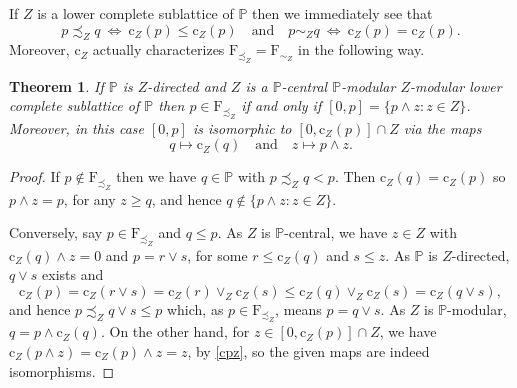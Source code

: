 \documentclass{amsart}
\newtheorem{thm}{Theorem}[section]
\theoremstyle{definition}
\numberwithin{equation}{section}
\begin{document}
If $Z$ is a lower complete sublattice of $\mathbb{P}$ then we immediately see that
\[p\precsim_Zq\ \Leftrightarrow\ \mathrm{c}_Z(p)\leq\mathrm{c}_Z(p)\quad\textrm{and}\quad p\sim_Zq\ \Leftrightarrow\ \mathrm{c}_Z(p)=\mathrm{c}_Z(p).\]
Moreover, $\mathrm{c}_Z$ actually characterizes $\mathrm{F}_{\precsim_Z}=\mathrm{F}_{\sim_Z}$ in the following way.

\begin{thm}
If $\mathbb{P}$ is $Z$-directed and $Z$ is a $\mathbb{P}$-central $\mathbb{P}$-modular $Z$-modular lower complete sublattice of $\mathbb{P}$ then $p\in\mathrm{F}_{\precsim_Z}$ if and only if $[0,p]=\{p\wedge z:z\in Z\}$.  Moreover, in this case $[0,p]$ is isomorphic to $[0,\mathrm{c}_Z(p)]\cap Z$ via the maps \[q\mapsto\mathrm{c}_Z(q)\quad\textrm{and}\quad z\mapsto p\wedge z.\]
\end{thm}

\begin{proof} If $p\notin\mathrm{F}_{\precsim_Z}$ then we have $q\in\mathbb{P}$ with $p\precsim_Zq<p$.  Then $\mathrm{c}_Z(q)=\mathrm{c}_Z(p)$ so $p\wedge z=p$, for any $z\geq q$, and hence $q\notin\{p\wedge z:z\in Z\}$.

Conversely, say $p\in\mathrm{F}_{\precsim_Z}$ and $q\leq p$.  As $Z$ is $\mathbb{P}$-central, we have $z\in Z$ with $\mathrm{c}_Z(q)\wedge z=0$ and $p=r\vee s$, for some $r\leq\mathrm{c}_Z(q)$ and $s\leq z$.  As $\mathbb{P}$ is $Z$-directed, $q\vee s$ exists and
\[\mathrm{c}_Z(p)=\mathrm{c}_Z(r\vee s)=\mathrm{c}_Z(r)\vee_Z\mathrm{c}_Z(s)\leq\mathrm{c}_Z(q)\vee_Z\mathrm{c}_Z(s)=\mathrm{c}_Z(q\vee s),\]
and hence $p\precsim_Z q\vee s\leq p$ which, as $p\in\mathrm{F}_{\precsim_Z}$, means $p=q\vee s$.  As $Z$ is $\mathbb{P}$-modular, $q=p\wedge\mathrm{c}_Z(q)$.  On the other hand, for $z\in[0,\mathrm{c}_Z(p)]\cap Z$, we have $\mathrm{c}_Z(p\wedge z)=\mathrm{c}_Z(p)\wedge z=z$, by \eqref{cpz}, so the given maps are indeed isomorphisms.
\end{proof}
\end{document}
